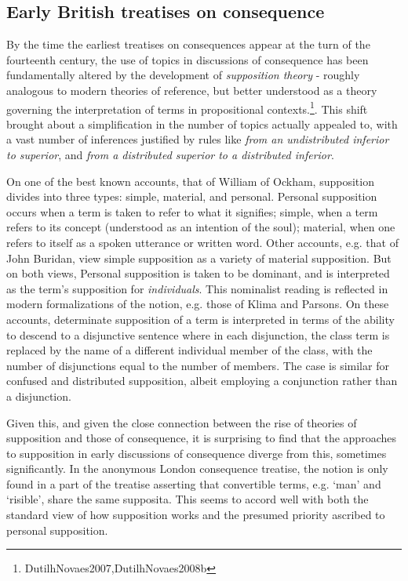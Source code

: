 \documentclass[a4paper,11pt]{article}
\begin{document}
\subsection{Early British  treatises on consequence}
By the time the earliest treatises on consequences appear at the turn of the fourteenth century, the use of topics in discussions of consequence has been fundamentally altered by the development of \textit{supposition theory} - roughly analogous to modern theories of reference, but better understood as a theory governing the interpretation of terms in propositional contexts.\footnote{DutilhNovaes2007,DutilhNovaes2008b}. This shift brought about a simplification in the number of topics actually appealed to, with a vast number of inferences justified by rules like \textit{from an undistributed inferior to superior}, and \textit{from a distributed superior to a distributed inferior}.

On one of the best known accounts, that of William of Ockham, supposition divides into three types: simple, material, and personal. Personal supposition occurs when a term is taken to refer to what it signifies; simple,  when a term refers to its concept (understood as an intention of the soul); material, when one refers to itself as a spoken utterance or written word. Other accounts, e.g. that of John Buridan, view simple supposition as a variety of material supposition. But on both views, Personal supposition is taken to be dominant, and is interpreted as the term's supposition for \textit{individuals}. This nominalist reading is reflected in modern formalizations of the notion, e.g. those of Klima and Parsons. On these accounts, determinate supposition of a term is interpreted in terms of the ability to descend to a disjunctive sentence where in each disjunction, the class term is replaced by the name of a different individual member of the class, with the number of disjunctions equal to the number of members. The case is similar for confused and distributed supposition, albeit employing a conjunction rather than a disjunction.

Given this, and given the close connection between the rise of theories of supposition and those of consequence, it is surprising to find that the approaches to supposition in early discussions of consequence diverge from this, sometimes significantly.  In the anonymous London consequence treatise, the notion is only found in a part of the treatise asserting that convertible terms, e.g. `man' and `risible', share the same supposita. This seems to accord well with both the standard view of how supposition works and the presumed priority ascribed to personal supposition.
\end{document}
